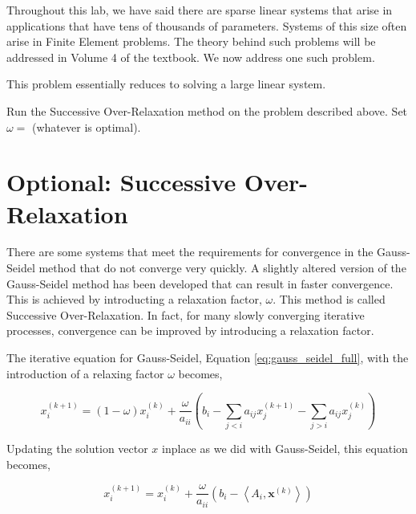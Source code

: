 Throughout this lab, we have said there are sparse linear systems that arise in applications that have tens of thousands of parameters. Systems of this size
often arise in Finite Element problems. The theory behind such problems will be
addressed in Volume 4 of the textbook. We now address one such problem.

\begin{problem} \label{prob:application}

This problem essentially reduces to solving a large linear system.


Run the Successive Over-Relaxation method on the problem described above. Set
$\omega = $ (whatever is optimal).

\end{problem}

\section*{Optional: Successive Over-Relaxation} %

There are some systems that meet the requirements for convergence in the
Gauss-Seidel method that do not converge very quickly. A slightly altered version
of the Gauss-Seidel method has been developed that can result in faster convergence.
This is achieved by introducting a relaxation factor, $\omega$. This method is
called Successive Over-Relaxation. In fact, for many slowly converging iterative processes, convergence can be improved by introducing a relaxation factor.

The iterative equation for Gauss-Seidel, Equation \ref{eq:gauss_seidel_full},
with the introduction of a relaxing factor $\omega$ becomes,

$$
x_i^{(k+1)} = (1 - \omega)x_i^{(k)} + \frac{\omega}{a_{ii}} \left (b_i - \sum_{j < i}a_{ij}x^{(k+1)}_j - \sum_{j > i}a_{ij}x^{(k)}_j \right )
$$

Updating the solution vector $x$ inplace as we did with Gauss-Seidel, this
equation becomes,

\begin{equation} \label{eq:sor}
x^{(k+1)}_i = x^{(k)}_i + \frac{\omega}{a_{ii}} \left ( b_i - \left < A_i, \mathbf{x}^{(k)} \right > \right )
\end{equation}

